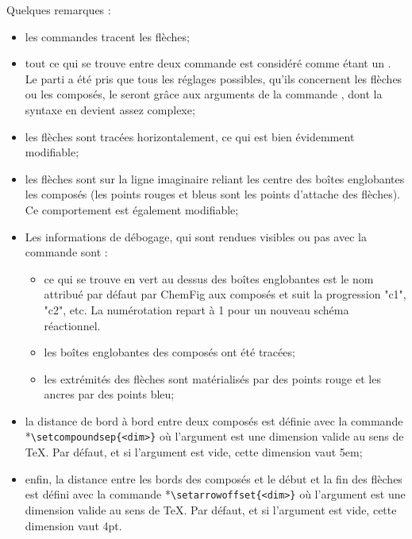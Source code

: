 \documentclass[10pt]{article}
\makeatletter
\newcommand\idx{\@ifstar{\let\print@or@not\@gobble\idx@}{\let\print@or@not\@firstofone\idx@}}
\newcommand\idx@[1]{%
	\ifcat\expandafter\noexpand\@car#1\@nil\relax%
		\expandafter\ifx\@car#1\@nil\protect
			\index{#1}%
			\print@or@not{#1}%
		\else
			\saveexpandmode\expandarg
			\StrSubstitute{\string#1}{\string @}{\@empty\protect\symbol{'100}}[\temp@]%
			\StrGobbleLeft\temp@1[\temp@]%
			\restoreexpandmode
			\expandafter\index\expandafter{\temp@ @\protect\texttt{\protect\textbackslash\temp@}}%
			\print@or@not{\texttt{\string#1}}%
		\fi
	\else
		\index{#1}%
		\print@or@not{#1}%
	\fi
}
\newcommand\CF{{\ECFAugie ChemFig}\xspace}
\makeatother
\begin{document}
Quelques remarques :
\begin{itemize}
	\item les commandes \idx{\arrow} tracent les flèches;
	\item tout ce qui se trouve entre deux commande \idx{\arrow} est considéré comme étant un \idx{composé}. Le parti a été pris que tous les réglages possibles, qu'ils concernent les flèches ou les composés, le seront grâce aux arguments de la commande \idx{\arrow}, dont la syntaxe en devient assez complexe;
	\item les flèches sont tracées horizontalement, ce qui est bien évidemment modifiable;
	\item les flèches sont sur la ligne imaginaire reliant les centre des boîtes englobantes les composés (les points rouges et bleus sont les points d'attache des flèches). Ce comportement est également modifiable;
	\item Les informations de débogage, qui sont rendues visibles ou pas avec la commande \idx{\schemedebug} sont :
	\begin{itemize}
		\item ce qui se trouve en vert au dessus des boîtes englobantes est le nom attribué par défaut par \CF aux composés et suit la progression "c1", "c2", etc. La numérotation repart à 1 pour un nouveau schéma réactionnel.
		\item les boîtes englobantes des composés ont été tracées;
		\item les extrémités des flèches sont matérialisés par des points rouge et les ancres par des points bleu;
	\end{itemize}
	\item la distance de bord à bord entre deux composés est définie avec la commande \idx*\setcompoundsep\verb-\setcompoundsep{<dim>}-\label{setcompoundsep} où l'argument est une dimension valide au sens de \TeX{}. Par défaut, et si l'argument est vide, cette dimension vaut 5em;
	\item enfin, la distance entre les bords des composés et le début et la fin des flèches est défini avec la commande \idx*\setarrowoffset\verb-\setarrowoffset{<dim>}- où l'argument est une dimension valide au sens de \TeX{}. Par défaut, et si l'argument est vide, cette dimension vaut 4pt.\label{setarrowoffset}
\end{itemize}
\end{document}
